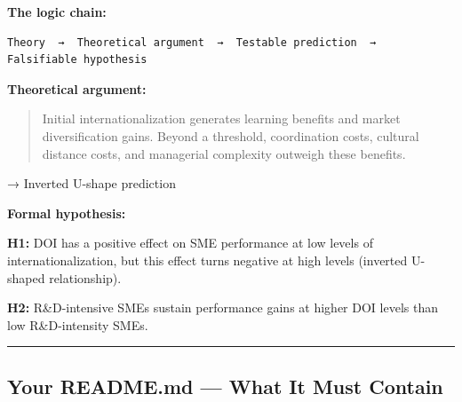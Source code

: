\documentclass[
  letterpaper,
  DIV=11,
  numbers=noendperiod]{scrartcl}
\begin{document}
\textbf{The logic chain:}

\begin{verbatim}
Theory  →  Theoretical argument  →  Testable prediction  →  Falsifiable hypothesis
\end{verbatim}

\textbf{Theoretical argument:}

\begin{quote}
Initial internationalization generates learning benefits and market
diversification gains. Beyond a threshold, coordination costs, cultural
distance costs, and managerial complexity outweigh these benefits.
\end{quote}

→ Inverted U-shape prediction

\textbf{Formal hypothesis:}

\textbf{H1:} DOI has a positive effect on SME performance at low levels
of internationalization, but this effect turns negative at high levels
(inverted U-shaped relationship).

\textbf{H2:} R\&D-intensive SMEs sustain performance gains at higher DOI
levels than low R\&D-intensity SMEs.

\begin{center}\rule{0.5\linewidth}{0.5pt}\end{center}

\subsection{Your README.md --- What It Must
Contain}\label{your-readme.md-what-it-must-contain}
\end{document}
